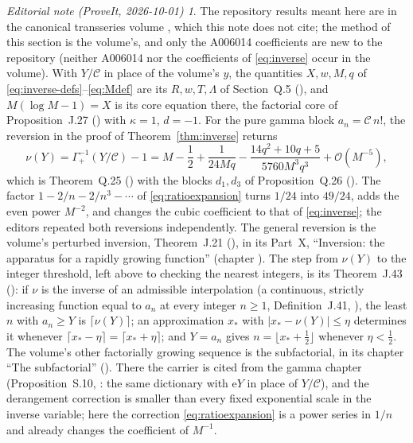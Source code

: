 \documentclass[11pt,a4paper]{article}
\theoremstyle{definition}
\theoremstyle{remark}
\newtheorem*{ednote}{Editorial note (ProveIt, 2026-10-01)}
\newcommand{\e}{\mathrm{e}}
\newcommand{\bigO}{\mathcal{O}}
\newcommand{\constC}{\mathcal{C}}
\begin{document}
\begin{ednote}
The repository results meant here are in the canonical transseries volume \cite{ed:tai}, which this note does not cite; the method of this section is the volume's, and only the A006014 coefficients are new to the repository (neither A006014 nor the coefficients of \eqref{eq:inverse} occur in the volume).
With \(Y/\constC\) in place of the volume's \(y\), the quantities \(X,w,M,q\) of \eqref{eq:inverse-defs}--\eqref{eq:Mdef} are its \(R,w,T,\Lambda\) of Section~Q.5 (), and \(M(\log M-1)=X\) is its core equation there, the factorial core of Proposition~J.27 () with \(\kappa=1\), \(d=-1\).
For the pure gamma block \(a_n=\constC\,n!\), the reversion in the proof of Theorem~\ref{thm:inverse} returns
\[
 \nu(Y)=\Gamma_+^{-1}(Y/\constC)-1
 =M-\frac12+\frac{1}{24Mq}-\frac{14q^2+10q+5}{5760M^3q^3}+\bigO(M^{-5}),
\]
which is Theorem~Q.25 () with the blocks \(d_1,d_3\) of Proposition~Q.26 ().
The factor \(1-2/n-2/n^3-\cdots\) of \eqref{eq:ratioexpansion} turns \(1/24\) into \(49/24\), adds the even power \(M^{-2}\), and changes the cubic coefficient to that of \eqref{eq:inverse}; the editors repeated both reversions independently.
The general reversion is the volume's perturbed inversion, Theorem~J.21 (), in its Part~X, ``Inversion: the apparatus for a rapidly growing function'' (chapter ).
The step from \(\nu(Y)\) to the integer threshold, left above to checking the nearest integers, is its Theorem~J.43 (): if \(\nu\) is the inverse of an admissible interpolation (a continuous, strictly increasing function equal to \(a_n\) at every integer \(n\ge1\), Definition~J.41, ), the least \(n\) with \(a_n\ge Y\) is \(\lceil\nu(Y)\rceil\); an approximation \(x_\ast\) with \(|x_\ast-\nu(Y)|\le\eta\) determines it whenever \(\lceil x_\ast-\eta\rceil=\lceil x_\ast+\eta\rceil\); and \(Y=a_n\) gives \(n=\lfloor x_\ast+\frac12\rfloor\) whenever \(\eta<\frac12\).
The volume's other factorially growing sequence is the subfactorial, in its chapter ``The subfactorial'' (). There the carrier is cited from the gamma chapter (Proposition~S.10, : the same dictionary with \(\e Y\) in place of \(Y/\constC\)), and the derangement correction is smaller than every fixed exponential scale in the inverse variable; here the correction \eqref{eq:ratioexpansion} is a power series in \(1/n\) and already changes the coefficient of \(M^{-1}\).
\end{ednote}
\end{document}
